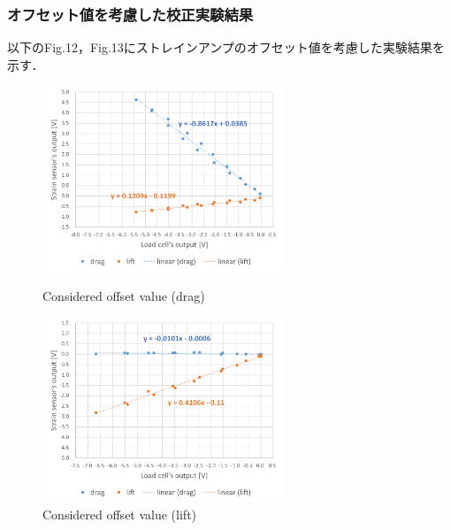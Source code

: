 \documentclass[twocolumn,a4j]{jsarticle}
\begin{document}
\subsubsection{オフセット値を考慮した校正実験結果}
以下のFig.12，Fig.13にストレインアンプのオフセット値を考慮した実験結果を示す．
\begin{figure}[htbp]
    \footnotesize
    \begin{center}
        \includegraphics[width=72mm]{../images/calibration_2_drag_offset.png}
        \caption{Considered offset value (drag)}
        \includegraphics[width=72mm]{../images/calibration_2_lift_offset.png}
        \caption{Considered offset value (lift)}
    \end{center}
\end{figure}
\newpage
\end{document}
